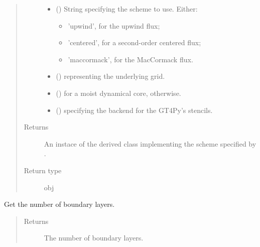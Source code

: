 \documentclass[letterpaper,10pt,english]{sphinxmanual}
\begin{document}
\begin{fulllineitems}
\begin{fulllineitems}
\begin{quote}
\begin{description}
\begin{itemize}
\begin{itemize}
\end{itemize}


\item {} 
 () \textendash{} 
String specifying the scheme to use. Either:
\begin{itemize}
\item {} 
’upwind’, for the upwind flux;

\item {} 
’centered’, for a second-order centered flux;

\item {} 
’maccormack’, for the MacCormack flux.

\end{itemize}


\item {} 
 () \textendash{} {\hyperref[\detokenize{api:grids.grid_xyz.GridXYZ}]{}} representing the underlying grid.

\item {} 
 () \textendash{}  for a moist dynamical core,  otherwise.

\item {} 
 () \textendash{}  specifying the backend for the GT4Py’s stencils.

\end{itemize}

\item[{Returns}] \leavevmode
An instace of the derived class implementing the scheme specified by .

\item[{Return type}] \leavevmode
obj

\end{description}\end{quote}

\end{fulllineitems}


\begin{fulllineitems}
\label{\detokenize{api:dycore.prognostic_isentropic.PrognosticIsentropic.nb}}
Get the number of boundary layers.
\begin{quote}\begin{description}
\item[{Returns}] \leavevmode
The number of boundary layers.


\end{description}
\end{quote}
\end{fulllineitems}
\end{fulllineitems}
\end{document}
